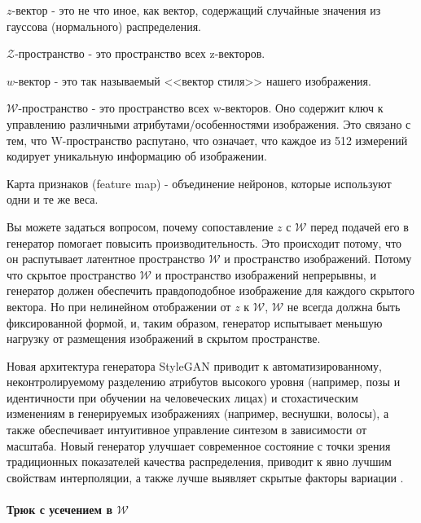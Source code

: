 \begin{definition}
    $z$-вектор - это не что иное, как вектор, содержащий случайные значения из гауссова (нормального) распределения.
\end{definition}
\begin{definition}
    $\mathcal{Z}$-пространство - это пространство всех z-векторов.
\end{definition}
\begin{definition}
    $w$-вектор - это так называемый <<вектор стиля>> нашего изображения.
\end{definition}
\begin{definition}
    $\mathcal{W}$-пространство - это пространство всех w-векторов. Оно содержит ключ к управлению различными атрибутами/особенностями изображения. Это связано с тем, что W-пространство распутано, что означает, что каждое из 512 измерений кодирует уникальную информацию об изображении.
\end{definition}
\begin{definition}
    Карта признаков (feature map) - объединение нейронов, которые используют одни и те же веса.
\end{definition}

Вы можете задаться вопросом, почему сопоставление $z$ с $\mathcal{W}$ перед подачей его в генератор помогает повысить производительность. Это происходит потому, что он распутывает латентное пространство $\mathcal{W}$ и пространство изображений. Потому что скрытое пространство $\mathcal{W}$ и пространство изображений непрерывны, и генератор должен обеспечить правдоподобное изображение для каждого скрытого вектора. Но при нелинейном отображении от $z$ к $\mathcal{W}$, $\mathcal{W}$ не всегда должна быть фиксированной формой, и, таким образом, генератор испытывает меньшую нагрузку от размещения изображений в скрытом пространстве.

Новая архитектура генератора StyleGAN приводит к автоматизированному, неконтролируемому разделению атрибутов высокого уровня (например, позы и идентичности при обучении на человеческих лицах) и стохастическим изменениям в генерируемых изображениях (например, веснушки, волосы), а также обеспечивает интуитивное управление синтезом в зависимости от масштаба. Новый генератор улучшает современное состояние с точки зрения традиционных показателей качества распределения, приводит к явно лучшим свойствам интерполяции, а также лучше выявляет скрытые факторы вариации \cite{StyleGAN}.

\paragraph{Трюк с усечением в $\mathcal{W}$}

